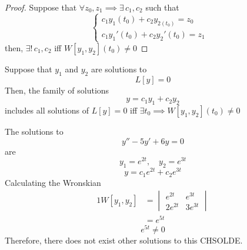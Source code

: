 \documentclass[diffeq.tex]{subfiles}
\begin{document}
    \begin{proof}
        Suppose that $\forall z_{0}, z_{1} \implies \exists\, c_{1}, c_{2}$ such that
        \begin{equation}
            \begin{cases}
                c_{1}y_{1}(t_{0}) + c_{2}y_{2(t_{0})} = z_{0}&\\
                c_{1}y_{1}'(t_{0}) + c_{2}y_{2}'(t_{0}) = z_{1}&
            \end{cases}
        \end{equation}
        then, $\exists!\,c_{1}, c_{2}$ iff $W[y_{1}, y_{2}](t_{0}) \neq 0$
    \end{proof}
    \begin{theorem}
        Suppose that $y_{1}$ and $y_{2}$ are solutions to
        \begin{equation}
            L[y] = 0
        \end{equation}
        Then, the family of solutions
        \begin{equation}
            y=c_{1}y_{1} + c_{2}y_{2}
        \end{equation}
        includes all solutions of $L[y] = 0$ iff $\exists t_{0} \implies W[y_{1}, y_{2}](t_{0}) \neq 0$
    \end{theorem}
    \np
    \begin{example}[Application of 10.2]
        The solutions to
        \begin{equation}
            y'' - 5y' + 6y = 0
        \end{equation}
        are
        \begin{equation}
            y_{1} = e^{2t},\quad y_{2} = e^{3t}
        \end{equation}
        \begin{equation}
            y = c_{1}e^{2t} + c_{2}e^{3t}
        \end{equation}
        Calculating the Wronskian
        \begin{alignat}{1}
            W[y_{1}, y_{2}] &= \begin{vmatrix}
                e^{2t} & e^{3t}\\
                2e^{2t} & 3e^{3t}
            \end{vmatrix}\\
            &= e^{5t}
        \end{alignat}
        \begin{equation}
            e^{5t} \neq 0
        \end{equation}
        Therefore, there does not exist other solutions to this CHSOLDE.
    \end{example}
\end{document}
